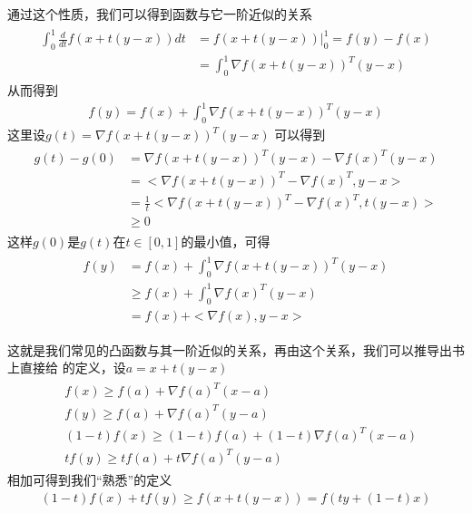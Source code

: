 \documentclass[UTF8]{ctexbook}
\begin{document}
通过这个性质，我们可以得到函数与它一阶近似的关系
\begin{align}
  \begin{split}
    \int_0^1 \frac{d}{dt} f( x + t ( y - x ) ) dt & = f( x + t ( y - x ) ) |_0^1 =
    f(y) - f(x) \\
    & = \int_0^1 { \nabla f( x + t ( y-x ) )  }^T ( y-x )    
  \end{split}
\end{align}
从而得到
\begin{align}
  f(y) = f(x) + \int_0^1 { \nabla f( x + t ( y-x ) )  }^T ( y-x )
\end{align}
这里设$g(t) = { \nabla f( x + t ( y-x ) )  }^T ( y-x )$ 可以得到
\begin{align}
  \begin{split}
    g(t) - g(0) & = { \nabla f( x + t ( y-x ) )  }^T ( y-x ) - { \nabla f( x )
    }^T ( y-x ) \\
    & = <{ \nabla f( x + t ( y-x ) )  }^T - \nabla { f( x )  }^T , y -x > \\
    & = \frac{1}{t} <{ \nabla f( x + t ( y-x ) )  }^T - \nabla { f( x )  }^T ,
    t(y -x) > \\
    & \geq 0
  \end{split}
\end{align}
这样$g(0)$是$g(t)$在$t \in [0, 1]$的最小值，可得
\begin{align}
  \begin{split}
    f(y) & = f(x) + \int_0^1 { \nabla f( x + t ( y-x ) )  }^T ( y-x ) \\
    & \geq f(x) + \int_0^1 { \nabla f(x) }^T ( y-x ) \\
    & = f(x) + < \nabla f(x), y-x >
  \end{split}
\end{align}

这就是我们常见的凸函数与其一阶近似的关系，再由这个关系，我们可以推导出书上直接给
的定义，设$a = x + t ( y-x ) $
\begin{align}
  \begin{split}
    & f(x) \geq f(a) + { \nabla f(a)  }^T ( x - a ) \\
    & f(y) \geq f(a) + { \nabla f(a) }^T ( y - a)  \\
    & ( 1-t ) f(x) \geq ( 1-t ) f(a) + ( 1-t ) { \nabla f(a)  }^T ( x - a ) \\
    & t f(y) \geq t f(a) + t { \nabla f(a) }^T ( y - a)  
  \end{split}
\end{align}
相加可得到我们“熟悉”的定义
\begin{align}
  ( 1-t ) f(x) + t f(y) \geq  f( x + t ( y-x ) ) = f( t y + ( 1-t ) x )
\end{align}
\end{document}
